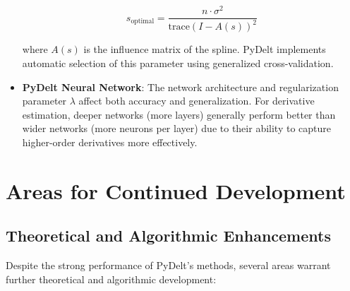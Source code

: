\documentclass[10pt,journal,compsoc]{IEEEtran}
\begin{document}
\begin{itemize}
    \begin{equation}
        s_{\text{optimal}} = \frac{n \cdot \sigma^2}{\text{trace}(I - A(s))^2}
    \end{equation}
    
    where $A(s)$ is the influence matrix of the spline. PyDelt implements automatic selection of this parameter using generalized cross-validation.
    
    \item \textbf{PyDelt Neural Network}: The network architecture and regularization parameter $\lambda$ affect both accuracy and generalization. For derivative estimation, deeper networks (more layers) generally perform better than wider networks (more neurons per layer) due to their ability to capture higher-order derivatives more effectively.
\end{itemize}

\section{Areas for Continued Development}

\subsection{Theoretical and Algorithmic Enhancements}

Despite the strong performance of PyDelt's methods, several areas warrant further theoretical and algorithmic development:
\end{document}
